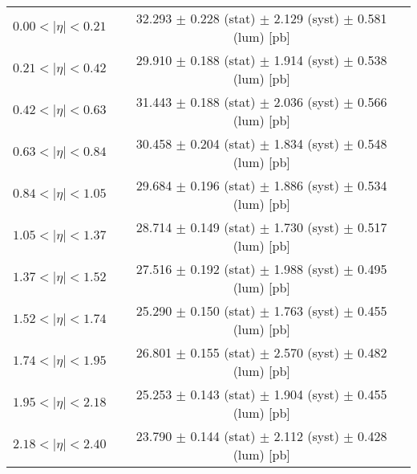 \begin{tabular}{lc}
\hline
$0.00 < |\eta| <0.21$          & 32.293 $\pm$ 0.228 (stat) $\pm$ 2.129 (syst) $\pm$ 0.581 (lum) [pb]  \\
$0.21 < |\eta| <0.42$          & 29.910 $\pm$ 0.188 (stat) $\pm$ 1.914 (syst) $\pm$ 0.538 (lum) [pb]  \\
$0.42 < |\eta| <0.63$          & 31.443 $\pm$ 0.188 (stat) $\pm$ 2.036 (syst) $\pm$ 0.566 (lum) [pb]  \\
$0.63 < |\eta| <0.84$          & 30.458 $\pm$ 0.204 (stat) $\pm$ 1.834 (syst) $\pm$ 0.548 (lum) [pb]  \\
$0.84 < |\eta| <1.05$          & 29.684 $\pm$ 0.196 (stat) $\pm$ 1.886 (syst) $\pm$ 0.534 (lum) [pb]  \\
$1.05 < |\eta| <1.37$          & 28.714 $\pm$ 0.149 (stat) $\pm$ 1.730 (syst) $\pm$ 0.517 (lum) [pb]  \\
$1.37 < |\eta| <1.52$          & 27.516 $\pm$ 0.192 (stat) $\pm$ 1.988 (syst) $\pm$ 0.495 (lum) [pb]  \\
$1.52 < |\eta| <1.74$          & 25.290 $\pm$ 0.150 (stat) $\pm$ 1.763 (syst) $\pm$ 0.455 (lum) [pb]  \\
$1.74 < |\eta| <1.95$          & 26.801 $\pm$ 0.155 (stat) $\pm$ 2.570 (syst) $\pm$ 0.482 (lum) [pb]  \\
$1.95 < |\eta| <2.18$          & 25.253 $\pm$ 0.143 (stat) $\pm$ 1.904 (syst) $\pm$ 0.455 (lum) [pb]  \\
$2.18 < |\eta| <2.40$          & 23.790 $\pm$ 0.144 (stat) $\pm$ 2.112 (syst) $\pm$ 0.428 (lum) [pb]  \\
\hline
\end{tabular}
